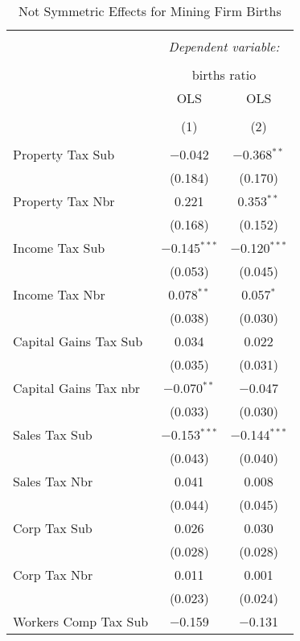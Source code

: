 
\begin{table}[!htbp] \centering 
  \caption{Not Symmetric Effects for  Mining Firm Births} 
  \label{21noequality} 
\footnotesize 
\begin{tabular}{@{\extracolsep{5pt}}lcc} 
\\[-1.8ex]\hline 
\hline \\[-1.8ex] 
 & \multicolumn{2}{c}{\textit{Dependent variable:}} \\ 
\cline{2-3} 
\\[-1.8ex] & \multicolumn{2}{c}{births ratio} \\ 
 & OLS & OLS \\ 
\\[-1.8ex] & (1) & (2)\\ 
\hline \\[-1.8ex] 
 Property Tax Sub & $-$0.042 & $-$0.368$^{**}$ \\ 
  & (0.184) & (0.170) \\ 
  Property Tax Nbr & 0.221 & 0.353$^{**}$ \\ 
  & (0.168) & (0.152) \\ 
  Income Tax Sub & $-$0.145$^{***}$ & $-$0.120$^{***}$ \\ 
  & (0.053) & (0.045) \\ 
  Income Tax Nbr & 0.078$^{**}$ & 0.057$^{*}$ \\ 
  & (0.038) & (0.030) \\ 
  Capital Gains Tax Sub & 0.034 & 0.022 \\ 
  & (0.035) & (0.031) \\ 
  Capital Gains Tax nbr & $-$0.070$^{**}$ & $-$0.047 \\ 
  & (0.033) & (0.030) \\ 
  Sales Tax Sub & $-$0.153$^{***}$ & $-$0.144$^{***}$ \\ 
  & (0.043) & (0.040) \\ 
  Sales Tax Nbr & 0.041 & 0.008 \\ 
  & (0.044) & (0.045) \\ 
  Corp Tax Sub & 0.026 & 0.030 \\ 
  & (0.028) & (0.028) \\ 
  Corp Tax Nbr & 0.011 & 0.001 \\ 
  & (0.023) & (0.024) \\ 
  Workers Comp Tax Sub & $-$0.159 & $-$0.131 \\ 

\end{tabular}
\end{table}
